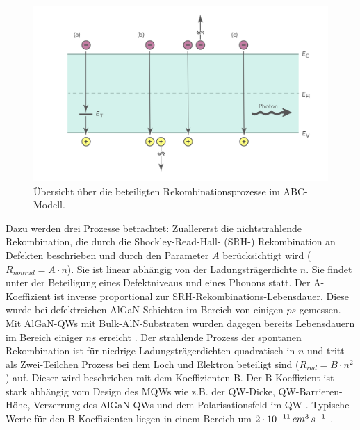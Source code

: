 %
\begin{figure}[h]
    \centering
    \begin{minipage}[t]{0.75\linewidth}
        \centering
        \includegraphics[width=\linewidth]{Bilder/rekbomChannels.png}
        \caption{Übersicht über die beteiligten Rekombinationsprozesse im ABC-Modell.}
        \label{fig:rekombChannels}
    \end{minipage}%
\end{figure}
\noindent
%
Dazu werden drei Prozesse betrachtet: Zuallererst die nichtstrahlende Rekombination, die durch die Shockley-Read-Hall- (SRH-) Rekombination an Defekten beschrieben und durch den Parameter $A$ berücksichtigt wird ($R_{nonrad} = A \cdot n $). Sie ist linear abhängig von der Ladungsträgerdichte $n$. Sie findet unter der Beteiligung eines Defektniveaus und eines Phonons statt. Der A-Koeffizient ist inverse proportional zur SRH-Rekombinations-Lebensdauer. Diese wurde bei defektreichen AlGaN-Schichten im Bereich von einigen $ps$ gemessen. Mit AlGaN-QWs mit Bulk-AlN-Substraten wurden dagegen bereits Lebensdauern im Bereich einiger $ns$ erreicht \cite{1882-0786-4-9-092101} \cite{doi:10.1002/pssc.201100424}. Der strahlende Prozess der spontanen Rekombination ist für niedrige Ladungsträgerdichten quadratisch in $n$ und tritt als Zwei-Teilchen Prozess bei dem Loch und Elektron beteiligt sind ($R_{rad} = B \cdot n^2 $) auf. Dieser wird beschrieben mit dem Koeffizienten B. Der B-Koeffizient ist stark abhängig vom Design des MQWs wie z.B. der QW-Dicke, QW-Barrieren-Höhe, Verzerrung des AlGaN-QWs und dem Polarisationsfeld im QW \cite{kneissl}. Typische Werte für den B-Koeffizienten liegen in einem Bereich um $2 \cdot 10^{-11} \thinspace cm^3 \thinspace s^{-1}$ \cite{1882-0786-8-2-022104} \cite{1882-0786-4-5-052101}.  
